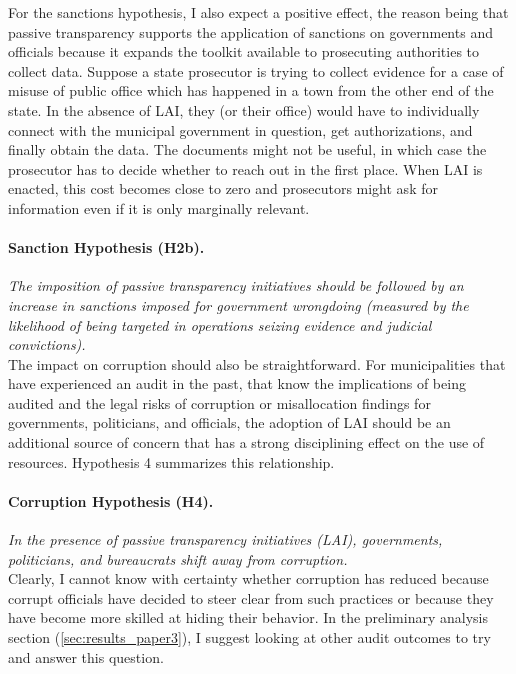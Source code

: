 \documentclass[11pt]{article}
\begin{document}
For the sanctions hypothesis, I also expect a positive effect, the reason being that passive transparency supports the application of sanctions on governments and officials because it expands the toolkit available to prosecuting authorities to collect data. Suppose a state prosecutor is trying to collect evidence for a case of misuse of public office which has happened in a town from the other end of the state. In the absence of LAI, they (or their office) would have to individually connect with the municipal government in question, get authorizations, and finally obtain the data. The documents might not be useful, in which case the prosecutor has to decide whether to reach out in the first place. When LAI is enacted, this cost becomes close to zero and prosecutors might ask for information even if it is only marginally relevant.

\paragraph{Sanction Hypothesis (H2b).} \emph{The imposition of passive transparency initiatives should be followed by an increase in sanctions imposed for government wrongdoing (measured by the likelihood of being targeted in operations seizing evidence and judicial convictions).} \\

The impact on corruption should also be straightforward. For municipalities that have experienced an audit in the past, that know the implications of being audited and the legal risks of corruption or misallocation findings for governments, politicians, and officials, the adoption of LAI should be an additional source of concern that has a strong disciplining effect on the use of resources. Hypothesis 4 summarizes this relationship.

\paragraph{Corruption Hypothesis (H4).} \emph{In the presence of passive transparency initiatives (LAI), governments, politicians, and bureaucrats shift away from corruption.} \\

Clearly, I cannot know with certainty whether corruption has reduced because corrupt officials have decided to steer clear from such practices or because they have become more skilled at hiding their behavior. In the preliminary analysis section (\ref{sec:results_paper3}), I suggest looking at other audit outcomes to try and answer this question.
\end{document}
